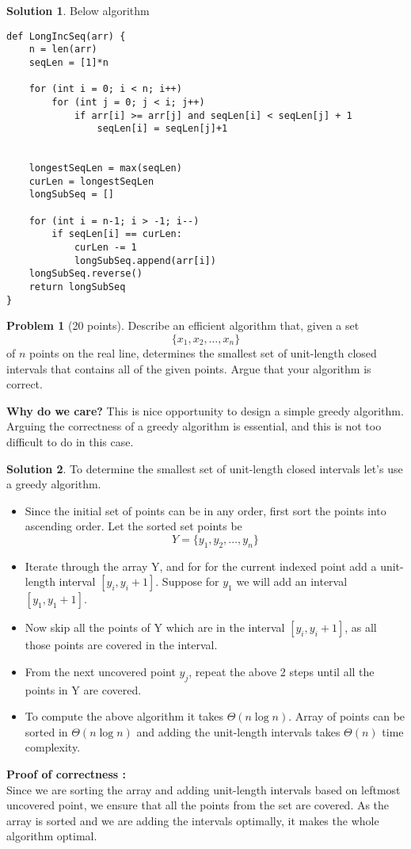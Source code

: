 \documentclass{article}
\theoremstyle{definition}
\newtheorem{problem}{Problem}
\newtheorem*{solution}{Solution}
\begin{document}
\begin{solution} Below algorithm 
\begin{verbatim}
def LongIncSeq(arr) {
    n = len(arr)
    seqLen = [1]*n
 
    for (int i = 0; i < n; i++)
        for (int j = 0; j < i; j++)
            if arr[i] >= arr[j] and seqLen[i] < seqLen[j] + 1
                seqLen[i] = seqLen[j]+1
 
    
    longestSeqLen = max(seqLen)
    curLen = longestSeqLen
    longSubSeq = []
    
    for (int i = n-1; i > -1; i--)
        if seqLen[i] == curLen:
            curLen -= 1
            longSubSeq.append(arr[i])
    longSubSeq.reverse()
    return longSubSeq
}
\end{verbatim}
\end{solution}
\newpage

\begin{problem}[20 points]
  Describe an efficient algorithm that, given a set
  $$\{ x_1, x_2, \ldots, x_n\}$$ of $n$ points on the real line,
  determines the smallest set of unit-length closed intervals that
  contains all of the given points. Argue that your algorithm is
  correct.

  {\small \textbf{Why do we care?} This is nice opportunity to design
    a simple greedy
    algorithm. Arguing the correctness of a greedy algorithm is
    essential, and this is not too difficult to do in this case.} 
  
\end{problem}
\begin{solution}
To determine the smallest set of unit-length closed intervals let's use a greedy algorithm.
\begin{itemize}
    \item Since the initial set of points can be in any order, first sort the points into ascending order. Let the sorted set points be $$Y = \{ y_1, y_2, \ldots, y_n\}$$
    \item Iterate through the array Y, and for for the current indexed point add a unit-length interval $[y_i, y_i + 1]$. Suppose for $y_1$ we will add an interval $[y_1, y_1 + 1]$.
    \item Now skip all the points of Y which are in the interval $[y_i, y_i + 1]$, as all those points are covered in the interval.
    \item From the next uncovered point $y_j$, repeat the above 2 steps until all the points in Y are covered.
    \item To compute the above algorithm it takes $\Theta(n\log{n})$. Array of points can be sorted in $\Theta(n\log{n})$ and adding the unit-length intervals takes $\Theta(n)$ time complexity.
\end{itemize}
\textbf{Proof of correctness :} \\
Since we are sorting the array and adding unit-length intervals based on leftmost uncovered point, we ensure that all the points from the set are covered. As the array is sorted and we are adding the intervals optimally, it makes the whole algorithm optimal.
\end{solution}
\end{document}
